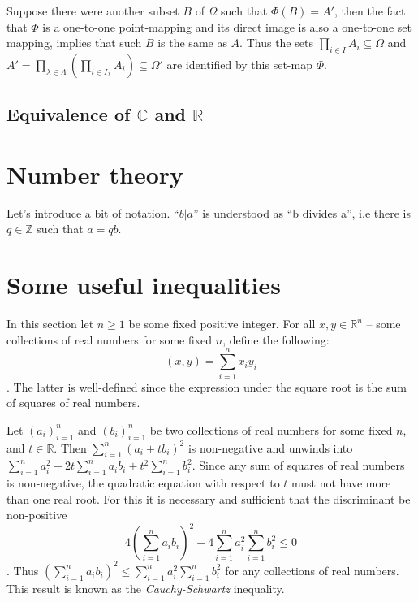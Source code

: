 \documentclass[a4paper]{article}
\newcommand{\brac}[1]{{\left({#1}\right)}}
\begin{document}
Suppose there were another subset $B$ of $\Omega$ such that $\Phi(B) = A'$, then the fact that $\Phi$ is a one-to-one point-mapping and its direct image is also a one-to-one set mapping, implies that such $B$ is the same as $A$. Thus the sets $\prod_{i \in I}A_i \subseteq \Omega$ and $A' = \prod_{\lambda \in \Lambda}(\prod_{i \in I_\lambda}A_i) \subseteq \Omega'$ are identified by this set-map $\Phi$.



\subsection{Equivalence of $\mathbb{C}$ and $\mathbb{R}$} %
\label{sub:equivalence_of_C_and_R}




\section{Number theory} %
\label{sec:number_theory}

Let's introduce a bit of notation. ``$b \vert a$'' is understood as ``b divides a'', i.e there is $q\in \mathbb{Z}$ such that $a = q b$.



\section{Some useful inequalities} %
\label{sec:some_useful_inequalities}
In this section let $n\geq 1$ be some fixed positive integer. For all $x, y \in \mathbb{R}^n$ -- some collections of real numbers for some fixed $n$, define the following: \[\brac{x, y} = \sum_{i=1}^n x_i y_i\]. The latter is well-defined since the expression under the square root is the sum of squares of real numbers.

Let $\brac{a_i}_{i=1}^n$ and $\brac{b_i}_{i=1}^n$ be two collections of real numbers for some fixed $n$, and $t\in \mathbb{R}$. Then $\sum_{i=1}^n (a_i + t b_i)^2$ is non-negative and unwinds into $\sum_{i=1}^n a_i^2 + 2t \sum_{i=1}^n a_i b_i + t^2 \sum_{i=1}^n b_i^2$. Since any sum of squares of real numbers is non-negative, the quadratic equation with respect to $t$ must not have more than one real root. For this it is necessary and sufficient that the discriminant be non-positive \[4 \brac{\sum_{i=1}^n a_i b_i}^2 - 4 \sum_{i=1}^n a_i^2 \sum_{i=1}^n b_i^2 \leq 0\]. Thus $\brac{\sum_{i=1}^n a_i b_i}^2 \leq \sum_{i=1}^n a_i^2 \sum_{i=1}^n b_i^2$ for any collections of real numbers. This result is known as the \emph{Cauchy-Schwartz} inequality.
\end{document}

